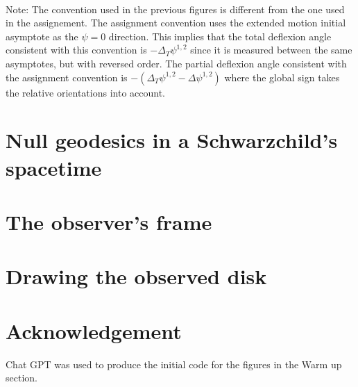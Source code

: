 \documentclass[10pt, a4paper]{article}
\begin{document}
{\begin{enumerate}
\begin{figure}[h!]
  \end{figure}\\
  Note: The convention used in the previous figures is different from the one used in the assignement. The assignment convention uses the extended motion initial asymptote as the $\psi=0$ direction. This implies that the total deflexion angle consistent with this convention is $-\Delta_T \psi^{1, 2}$ since it is measured between the same asymptotes, but with reversed order. The partial deflexion angle consistent with the assignment convention is $-(\Delta_T\psi^{1, 2}-\Delta\psi^{1, 2})$ where the global sign takes the relative orientations into account.
\end{enumerate}
\newpage
\section{Null geodesics in a Schwarzchild's spacetime}

\section{The observer's frame}

\section{Drawing the observed disk}

\section{Acknowledgement}

Chat GPT was used to produce the initial code for the figures in the Warm up section.

}

\makereferences


\end{document}
